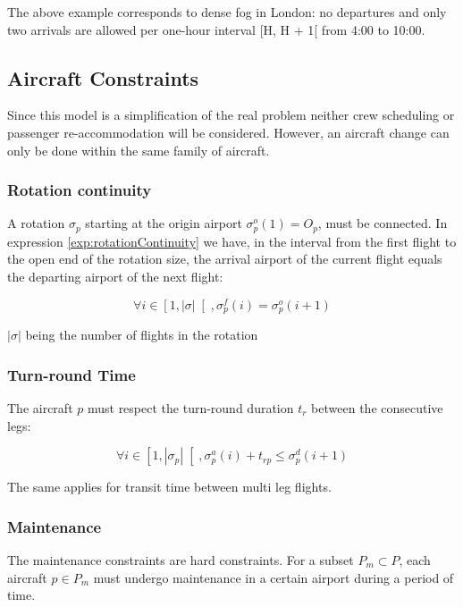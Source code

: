 \documentclass[ijoo,nonblindrev]{informs-ijoo}
\begin{document}
	The above example corresponds to dense fog in London: no departures and only two arrivals are allowed per one-hour interval [H, H + 1[ from 4:00 to 10:00.		

\subsection{Aircraft Constraints} \label{sec:aircConstraints}

Since this model is a simplification of the real problem neither crew scheduling or passenger re-accommodation will be considered. However, an aircraft change can only be done within the same family of aircraft.

\subsubsection{Rotation continuity}

A rotation $ \sigma_p$ starting  at the origin airport  $ \sigma^o_p(1) = O_p$, must be connected. In expression \ref{exp:rotationContinuity} we have, in the interval from the first flight to the open end of the rotation size, the arrival airport of the current flight equals the departing airport of the next flight:

\begin{equation}
	\label{exp:rotationContinuity}
	\forall i \in \left[1, |\sigma|\right[, \sigma^f_p(i) = \sigma^o_p(i+1)
\end{equation}

$ |\sigma| $ being the number of flights in the rotation

\subsubsection{Turn-round Time}

The aircraft $p$ must respect the turn-round duration  $t_r$ between the consecutive legs:

\begin{equation}
	\label{exp:turnroundtime}
	\forall i \in \left[1, |\sigma_p|\right[, \sigma^a_p(i) + t_{rp} \leq \sigma^d_p(i+1)
\end{equation}


The same applies for transit time between multi leg flights.

\subsubsection{Maintenance}
The maintenance constraints are hard constraints. For a subset $P_m \subset P$, each aircraft $p \in P_m$ must undergo maintenance in a certain airport during a period of time.
\end{document}
